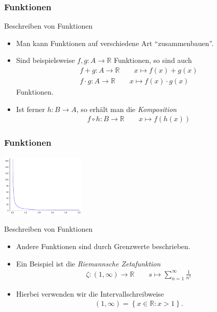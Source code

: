 \documentclass{beamer}
\renewcommand{\emph}[1]{{\textcolor{solarizedRed}{\itshape #1}}}
\newcommand\RR{\mathbb R}
\newcommand\cbc[1]{\left\{{#1}\right\}}
\renewcommand{\ae}{\"a}
\newcommand{\mytitle}{Funktionen}
\begin{document}
\begin{frame}\frametitle{\mytitle}
	\begin{block}{Beschreiben von Funktionen}
		\begin{itemize}
			\item Man kann Funktionen auf verschiedene Art ``zusammenbauen''.
			\item Sind beispielsweise $f,g:A\to\RR$ Funktionen, so sind auch
				\begin{align*}
				f+g:A\to\RR\qquad x\mapsto f(x)+g(x)\\
				f\cdot g:A\to\RR\qquad x\mapsto f(x)\cdot g(x)
				\end{align*}
				Funktionen.
			\item Ist ferner $h:B\to A$, so erh\ae lt man die \emph{Komposition}
				\begin{align*}
				f\circ h:B\to\RR\qquad x\mapsto f(h(x))
				\end{align*}
		\end{itemize}
	\end{block}
\end{frame}

\begin{frame}\frametitle{\mytitle}
	\hfill\includegraphics[height=30mm]{pics/graph_zeta.pdf}
	\begin{block}{Beschreiben von Funktionen}
		\begin{itemize}
			\item Andere Funktionen sind durch Grenzwerte beschrieben.
			\item Ein Beispiel ist die \emph{Riemannsche Zetafunktion}
				\begin{align*}
					\zeta:(1,\infty)\to\RR\qquad s\mapsto\sum_{n=1}^\infty\frac{1}{n^s}
				\end{align*}
			\item Hierbei verwenden wir die \alert{Intervallschreibweise}
				\begin{align*}
					(1,\infty)=\cbc{x\in\RR:x>1}.
				\end{align*}
		\end{itemize}
	\end{block}
\end{frame}
\end{document}
